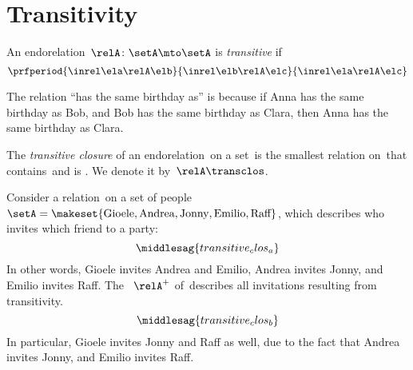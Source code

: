 
\section{Transitivity}

\begin{ctdefinition}
    \label{def:endo_transitive}
    An endorelation~$\relA\colon \setA\mto \setA$ is \emph{transitive} if
    \begin{equation}\label{eq:transitive}
        \prfperiod{
            \inrel \ela \relA \elb
        }{
            \inrel \elb \relA \elc
        }{
            \inrel \ela \relA \elc
        }
    \end{equation}
\end{ctdefinition}

\begin{example}
    The relation ``has the same birthday as'' is  because if Anna has the same birthday as Bob, and Bob has the same birthday as Clara, then Anna has the same birthday as Clara.
\end{example}

\begin{ctdefinition}
    \label{def:transitive-closure}
    The \emph{transitive closure} of an endorelation~\relA on a set~\setA is the smallest relation on~\setA that contains~\relA and is .
    We denote it by~$\relA\transclos$.
\end{ctdefinition}


\begin{example}
    \label{exa:party}
    Consider a relation~\relA on a set of people~$\setA=\makeset{\text{Gioele}, \text{Andrea}, \text{Jonny}, \text{Emilio}, \text{Raff}}$, which describes who invites which friend to a party:
    \begin{equation}
        \label{eq:transitive_clos_a}
        \middlesag{transitive_clos_a}
    \end{equation}
    In other words, Gioele invites Andrea and Emilio, Andrea invites Jonny, and Emilio invites Raff.
    The ~$\relA^+$ of~\relA describes all invitations resulting from transitivity.
    \begin{equation}
        \label{eq:transitive_clos_b}
        \middlesag{transitive_clos_b}
    \end{equation}
    In particular, Gioele invites Jonny and Raff as well, due to the fact that Andrea invites Jonny, and Emilio invites Raff.
\end{example}

